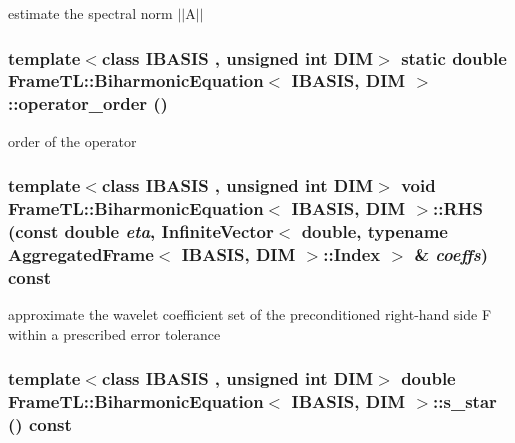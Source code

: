 estimate the spectral norm $|$$|$A$|$$|$ \hypertarget{classFrameTL_1_1BiharmonicEquation_89f12c9466f7e91a5dc94c45525ee17f}{
\subsubsection[{operator\_\-order}]{\setlength{\rightskip}{0pt plus 5cm}template$<$class IBASIS , unsigned int DIM$>$ static double {\bf FrameTL::BiharmonicEquation}$<$ IBASIS, DIM $>$::operator\_\-order ()}}
\label{classFrameTL_1_1BiharmonicEquation_89f12c9466f7e91a5dc94c45525ee17f}


order of the operator \hypertarget{classFrameTL_1_1BiharmonicEquation_032b924e5b4f43048535d3f2544eb27d}{
\subsubsection[{RHS}]{\setlength{\rightskip}{0pt plus 5cm}template$<$class IBASIS , unsigned int DIM$>$ void {\bf FrameTL::BiharmonicEquation}$<$ IBASIS, DIM $>$::RHS (const double {\em eta}, \/  InfiniteVector$<$ double, typename {\bf AggregatedFrame}$<$ IBASIS, DIM $>$::{\bf Index} $>$ \& {\em coeffs}) const}}
\label{classFrameTL_1_1BiharmonicEquation_032b924e5b4f43048535d3f2544eb27d}


approximate the wavelet coefficient set of the preconditioned right-hand side F within a prescribed  error tolerance \hypertarget{classFrameTL_1_1BiharmonicEquation_c619e416f851afd5a307014a69cc6d35}{
\subsubsection[{s\_\-star}]{\setlength{\rightskip}{0pt plus 5cm}template$<$class IBASIS , unsigned int DIM$>$ double {\bf FrameTL::BiharmonicEquation}$<$ IBASIS, DIM $>$::s\_\-star () const}}
\label{classFrameTL_1_1BiharmonicEquation_c619e416f851afd5a307014a69cc6d35}


